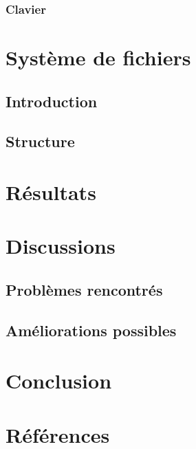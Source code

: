 \documentclass[a4paper]{article}
\begin{document}
\subsubsection{Clavier}


\section{Système de fichiers}
\subsection{Introduction}


\subsection{Structure}


\section{Résultats}


\section{Discussions}
\subsection{Problèmes rencontrés}


\subsection{Améliorations possibles}


\section{Conclusion}

\newpage


\section{Références}
\nocite{*}


\end{document}
